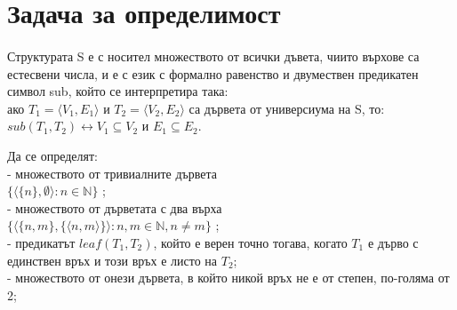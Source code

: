 \documentclass{article}
\begin{document}
\newpage
\section{Задача за определимост}
\paragraph{}
Структурата S е с носител множеството от всички дъвета, чиито върхове са естесвени числа, и е с език с формално равенство и двумествен предикатен символ  sub, който се интерпретира така: \\ако  $ T_1 = \langle V_1, E_1 \rangle $ и $ T_2 = \langle V_2, E_2 \rangle $  са дървета от универсиума на S, то: \\
$ sub(T_1, T_2) \leftrightarrow  V_1 \subseteq V_2  $ и $E_1 \subseteq E_2 $.

\begin{addmargin}[1em]{2em}
Да се определят: \\
- множеството от тривиалните дървета \\ 
\indent $ \{ \langle \{ n \},  \emptyset \rangle : n \in \mathbb{N} \} $ ;\\
- множеството от дърветата с два върха \\
\indent $ \{ \langle \{n, m \},  \{ \langle n, m \rangle \} \rangle : n, m \in \mathbb{N} , n \ne m \} $ ;\\
- предикатът $leaf(T_1,T_2)$, който е верен точно тогава, когато $T_1$ е дърво с единствен връх и този връх е листо на $T_2$; \\
- множеството от онези дървета, в който никой връх не е от степен, по-голяма от 2;
\end{addmargin}
\end{document}
